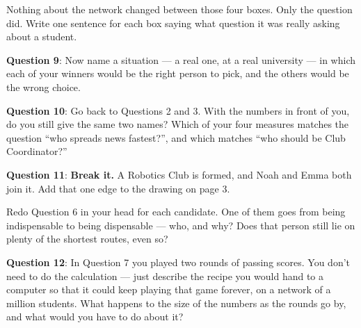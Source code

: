 \documentclass[a4paper, 14pt]{extarticle}
\begin{document}
\clearpage

Nothing about the network changed between those four boxes. Only the question
did. Write one sentence for each box saying what question it was really asking
about a student.

\vspace{11em}

{\bf Question 9}: Now name a situation --- a real one, at a real university ---
in which each of your winners would be the right person to pick, and the others
would be the wrong choice.

\vspace{11em}

\clearpage

{\bf Question 10}: Go back to Questions 2 and 3. With the numbers in front of
you, do you still give the same two names? Which of your four measures matches
the question ``who spreads news fastest?'', and which matches ``who should be
Club Coordinator?''

\vspace{11em}

{\bf Question 11}: {\bf Break it.} A Robotics Club is formed, and Noah and Emma
both join it. Add that one edge to the drawing on page 3.

Redo Question 6 in your head for each candidate. One of them goes from being
indispensable to being dispensable --- who, and why? Does that person still lie
on plenty of the shortest routes, even so?

\vspace{11em}

\clearpage

{\bf Question 12}: In Question 7 you played two rounds of passing scores. You
don't need to do the calculation --- just describe the recipe you would hand to
a computer so that it could keep playing that game forever, on a network of a
million students. What happens to the size of the numbers as the rounds go by,
and what would you have to do about it?

\vspace{12em}
\end{document}
